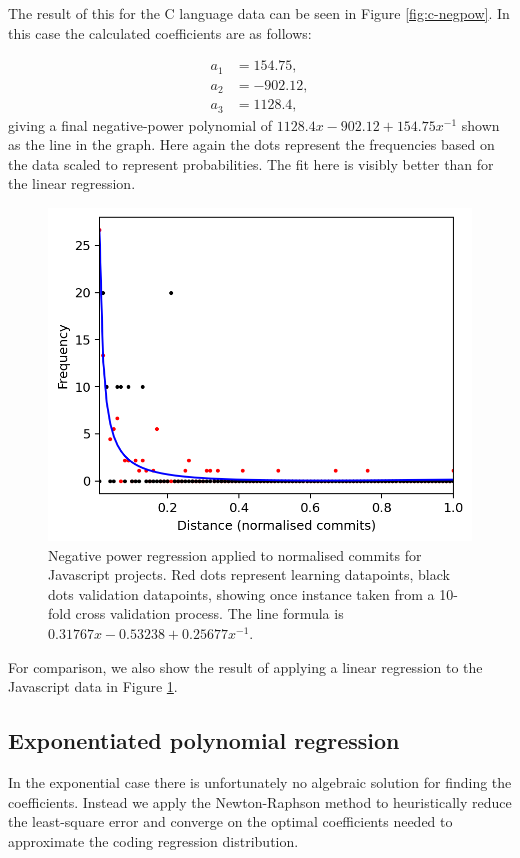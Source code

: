 \documentclass[pdflatex, sn-mathphys, referee]{sn-jnl}%
\theoremstyle{thmstyleone}%
\theoremstyle{thmstyletwo}%
\theoremstyle{thmstylethree}%
\theoremstyle{thmstyleone}
\begin{document}
The result of this for the C language data can be seen in Figure \ref{fig:c-negpow}. In this case the calculated coefficients are as follows:

\begin{align*}
a_1 & = 154.75, \\
a_2 & = -902.12, \\
a_3 & = 1128.4,
\end{align*}
giving a final negative-power polynomial of $1128.4 x - 902.12 + 154.75 x^{-1}$ shown as the line in the graph. Here again the dots represent the frequencies based on the data scaled to represent probabilities. The fit here is visibly better than for the linear regression.

\begin{figure}[t]
\centering
\includegraphics[width=0.7\columnwidth]{Fig15}%
\caption{\label{fig:javascript-negpow}Negative power regression applied to normalised commits for Javascript projects. Red dots represent learning datapoints, black dots validation datapoints, showing once instance taken from a 10-fold cross validation process. The line formula is $0.31767 x - 0.53238 + 0.25677 x^{-1}$.}
\end{figure}

For comparison, we also show the result of applying a linear regression to the Javascript data in Figure \ref{fig:javascript-negpow}.

\subsection{Exponentiated polynomial regression}

In the exponential case there is unfortunately no algebraic solution for finding the coefficients. Instead we apply the Newton-Raphson method to heuristically reduce the least-square error and converge on the optimal coefficients needed to approximate the coding regression distribution.
\end{document}
